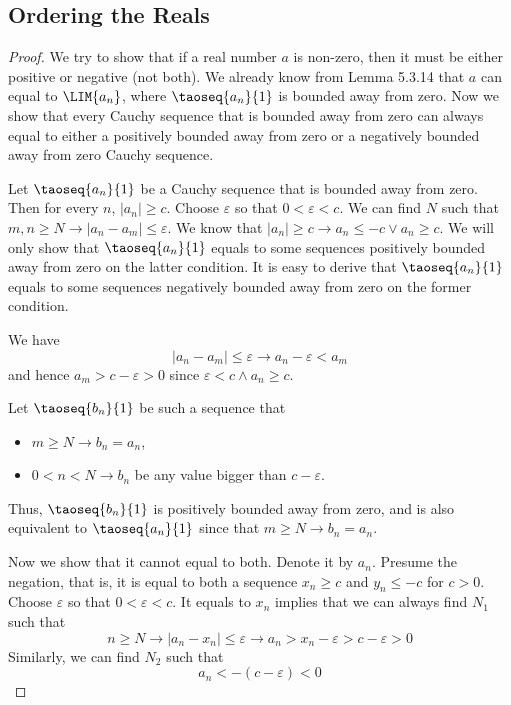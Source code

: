 \subsection{Ordering the Reals}
\begin{proof}
We try to show that if a real number $a$ is non-zero, then it must be either positive or negative (not both). We already know from 
Lemma 5.3.14 that $a$ can equal to $\LIM{a_n}$, where $\taoseq{a_n}{1}$ is bounded away from zero. Now we show that every Cauchy 
sequence that is bounded away from zero can always equal to either a positively bounded away from zero or a negatively bounded away 
from zero Cauchy sequence.

Let $\taoseq{a_n}{1}$ be a Cauchy sequence that is bounded away from zero. Then for every $n$, $|a_n| \geq c$. Choose $\varepsilon$ 
so that $0<\varepsilon<c$. We can find $N$ such that $m,n \geq N \longrightarrow |a_n-a_m| \leq \varepsilon$. We know that 
$|a_n| \geq c \longrightarrow a_n\leq -c \vee a_n \geq c$. We will only show that $\taoseq{a_n}{1}$ equals to some sequences 
positively bounded away from zero on the latter condition. It is easy to derive that $\taoseq{a_n}{1}$ equals to some sequences 
negatively bounded away from zero on the former condition.

We have
\[
|a_n-a_m| \leq \varepsilon \longrightarrow a_n -\varepsilon <a_m
\]
and hence $a_m >c-\varepsilon>0$ since $\varepsilon<c \wedge a_n \geq c$.

Let $\taoseq{b_n}{1}$ be such a sequence that
\begin{itemize}
\item $m \geq N \longrightarrow b_n = a_n$,
\item $0<n<N \longrightarrow b_n$ be any value bigger than $c-\varepsilon$.
\end{itemize}

Thus, $\taoseq{b_n}{1}$ is positively bounded away from zero, and is also equivalent to $\taoseq{a_n}{1}$ since that 
$m \geq N \longrightarrow b_n = a_n$.

Now we show that it cannot equal to both. Denote it by $a_n$. Presume the negation, that is, it is equal to both a sequence 
$x_n \geq c$ and $y_n \leq -c$ for $c>0$. Choose $\varepsilon$ so that $0<\varepsilon<c$. It equals to $x_n$ implies that we can always 
find $N_1$ such that 
\[
n \geq N \longrightarrow |a_n-x_n| \leq \varepsilon \longrightarrow a_n > x_n -\varepsilon >c-\varepsilon >0
\]
Similarly, we can find $N_2$ such that
\[
a_n < -(c-\varepsilon)<0
\]


\end{proof}
